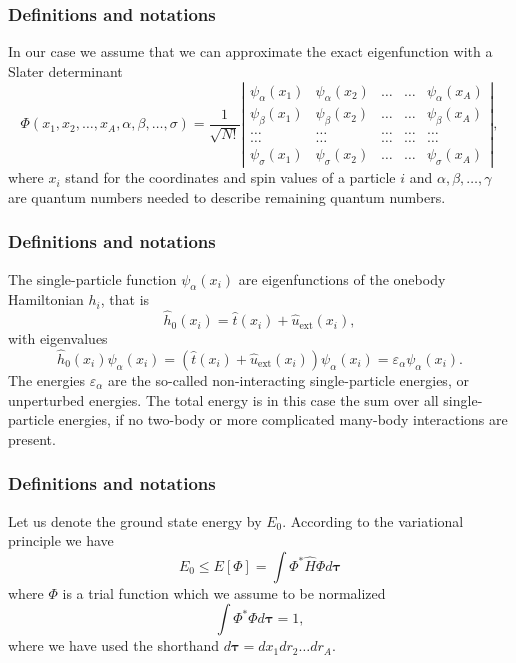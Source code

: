 \documentclass{beamer}
\begin{document}
\begin{frame}
\frametitle{Definitions and notations}

\begin{block}{}
In our case we assume that  we can approximate the exact eigenfunction with a Slater determinant
\begin{equation}
   \Phi(x_1, x_2,\dots ,x_A,\alpha,\beta,\dots, \sigma)=\frac{1}{\sqrt{N!}}
\left| \begin{array}{ccccc} \psi_{\alpha}(x_1)& \psi_{\alpha}(x_2)& \dots & \dots & \psi_{\alpha}(x_A)\\
                            \psi_{\beta}(x_1)&\psi_{\beta}(x_2)& \dots & \dots & \psi_{\beta}(x_A)\\  
                            \dots & \dots & \dots & \dots & \dots \\
                            \dots & \dots & \dots & \dots & \dots \\
                     \psi_{\sigma}(x_1)&\psi_{\sigma}(x_2)& \dots & \dots & \psi_{\sigma}(x_A)\end{array} \right|, \label{eq:HartreeFockDet}
\end{equation}
where  $x_i$  stand for the coordinates and spin values of a particle $i$ and $\alpha,\beta,\dots, \gamma$ 
are quantum numbers needed to describe remaining quantum numbers.  
\end{block}
\end{frame}

\begin{frame}
\frametitle{Definitions and notations}

\begin{block}{}
The single-particle function $\psi_{\alpha}(x_i)$  are eigenfunctions of the onebody
Hamiltonian $h_i$, that is
\[
\hat{h}_0(x_i)=\hat{t}(x_i) + \hat{u}_{\mathrm{ext}}(x_i),
\]
with eigenvalues 
\[
\hat{h}_0(x_i) \psi_{\alpha}(x_i)=\left(\hat{t}(x_i) + \hat{u}_{\mathrm{ext}}(x_i)\right)\psi_{\alpha}(x_i)=\varepsilon_{\alpha}\psi_{\alpha}(x_i).
\]
The energies $\varepsilon_{\alpha}$ are the so-called non-interacting single-particle energies, or unperturbed energies. 
The total energy is in this case the sum over all  single-particle energies, if no two-body or more complicated
many-body interactions are present.
\end{block}
\end{frame}

\begin{frame}
\frametitle{Definitions and notations}

\begin{block}{}
Let us denote the ground state energy by $E_0$. According to the
variational principle we have
\[
  E_0 \le E[\Phi] = \int \Phi^*\hat{H}\Phi d\mathbf{\tau}
\]
where $\Phi$ is a trial function which we assume to be normalized
\[
  \int \Phi^*\Phi d\mathbf{\tau} = 1,
\]
where we have used the shorthand $d\mathbf{\tau}=dx_1dr_2\dots dr_A$.
\end{block}
\end{frame}
\end{document}

